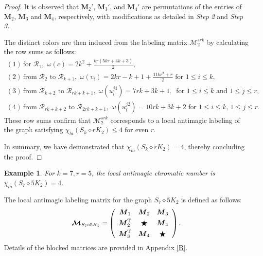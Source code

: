 \documentclass[12pt]{article}
\newtheorem{example}{Example}[section]
\begin{document}
\begin{proof}
It is observed that $\boldsymbol{M}_{2}'$, $\boldsymbol{M}_{3}'$, and $\boldsymbol{M}_{4}'$ are permutations of the entries of $\boldsymbol{M}_{2}$, $\boldsymbol{M}_{3}$ and $\boldsymbol{M}_{4}$, respectively, with modifications as detailed in {\it Step 2} and {\it Step 3}.

The distinct colors are then induced from the labeling matrix $\boldsymbol{\mathcal{M}}_{2}^{srk}$ by calculating the row sums as follows:
\begin{equation*}
\begin{array}{l}
(1)\,\text{for $\mathcal{R}_{1}$},\,\,\omega(c)=2k^{2}+\frac{kr(5kr+4k+3)}{2},\\[6pt]
(2)\,\text{from $\mathcal{R}_{2}$ to $\mathcal{R}_{k+1}$},\,\,\omega(v_{i})=2kr-k+1+\frac{11kr^{2}+r}{2}\text{ for $1\leq i\leq k$},\\[6pt]
(3)\,\text{from $\mathcal{R}_{k+2}$ to $\mathcal{R}_{rk+k+1}$},\,\,\omega(u_{i}^{j1})=7rk+3k+1,\,\text{ for $1\leq i\leq k$ and $1\leq j\leq r$},\\[6pt]
(4)\,\text{from $\mathcal{R}_{rk+k+2}$ to $\mathcal{R}_{2rk+k+1}$},\,\,\omega(u_{i}^{j2})=10rk+3k+2\text{ for $1\leq i\leq k$, $1\leq j\leq r$}.
\end{array}
\end{equation*}
These row sums confirm that $\boldsymbol{\mathcal{M}}_{2}^{srk}$ corresponds to a local antimagic labeling of the graph satisfying $\chi_{la}(S_{k}\diamond rK_{2}) \leq 4$ for even $r$.

In summary, we have demonstrated that $\chi_{la}(S_{k}\diamond rK_{2}) = 4$, thereby concluding the proof.
\end{proof}

\begin{example}\label{E3}
 For $k=7,r=5$, the local antimagic chromatic number is $\chi_{la}(S_{7}\diamond 5K_{2})=4$.
\end{example}	
The local antimagic labeling matrix for the graph $S_{7} \diamond 5K_{2}$ is defined as follows:
\begin{equation*}
\boldsymbol{\mathcal{M}}_{S_{7}\diamond 5K_{2}}=\left(\begin{array}{ccc}
\boldsymbol{M}_{1} & \boldsymbol{M}_{2} & \boldsymbol{M}_{3}\\[3pt]
\boldsymbol{M}_{2}^{\rm{T}} &\bigstar & \boldsymbol{M}_{4}\\[3pt]
\boldsymbol{M}_{3}^{\rm{T}} & \boldsymbol{M}_{4} &\bigstar
\end{array}\right).
\end{equation*}
Details of the blocked matrices are provided in Appendix \ref{B}.
\end{document}
